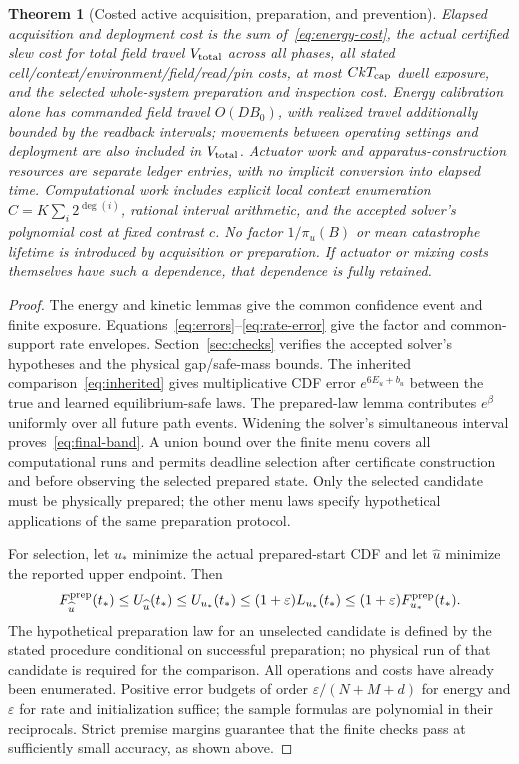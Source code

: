 \documentclass[11pt]{article}
\newtheorem{theorem}{Theorem}
\newcommand{\eps}{\varepsilon}
\begin{document}
\begin{theorem}[Costed active acquisition, preparation, and prevention]
Elapsed acquisition and deployment cost is the sum of~\eqref{eq:energy-cost}, the actual certified slew cost for total field travel $V_{\rm total}$ across all phases, all stated cell/context/environment/field/read/pin costs, at most $CkT_{\rm cap}$ dwell exposure, and the selected whole-system preparation and inspection cost. Energy calibration alone has commanded field travel $O(DB_0)$, with realized travel additionally bounded by the readback intervals; movements between operating settings and deployment are also included in $V_{\rm total}$. Actuator work and apparatus-construction resources are separate ledger entries, with no implicit conversion into elapsed time. Computational work includes explicit local context enumeration $C=K\sum_i2^{\deg(i)}$, rational interval arithmetic, and the accepted solver's polynomial cost at fixed contrast $c$. No factor $1/\pi_u(B)$ or mean catastrophe lifetime is introduced by acquisition or preparation. If actuator or mixing costs themselves have such a dependence, that dependence is fully retained.
\end{theorem}
\begin{proof}
The energy and kinetic lemmas give the common confidence event and finite exposure. Equations~\eqref{eq:errors}--\eqref{eq:rate-error} give the factor and common-support rate envelopes. Section~\ref{sec:checks} verifies the accepted solver's hypotheses and the physical gap/safe-mass bounds. The inherited comparison~\eqref{eq:inherited} gives multiplicative CDF error $e^{6E_u+b_u}$ between the true and learned equilibrium-safe laws. The prepared-law lemma contributes $e^\beta$ uniformly over all future path events. Widening the solver's simultaneous interval proves~\eqref{eq:final-band}. A union bound over the finite menu covers all computational runs and permits deadline selection after certificate construction and before observing the selected prepared state. Only the selected candidate must be physically prepared; the other menu laws specify hypothetical applications of the same preparation protocol.

For selection, let $u_*$ minimize the actual prepared-start CDF and let $\widehat u$ minimize the reported upper endpoint. Then
\[
 F_{\widehat u}^{\rm prep}(t_*)\le U_{\widehat u}(t_*)\le U_{u_*}(t_*)
 \le(1+\eps)L_{u_*}(t_*)\le(1+\eps)F_{u_*}^{\rm prep}(t_*).
\]
The hypothetical preparation law for an unselected candidate is defined by the stated procedure conditional on successful preparation; no physical run of that candidate is required for the comparison. All operations and costs have already been enumerated. Positive error budgets of order $\eps/(N+M+d)$ for energy and $\eps$ for rate and initialization suffice; the sample formulas are polynomial in their reciprocals. Strict premise margins guarantee that the finite checks pass at sufficiently small accuracy, as shown above.
\end{proof}
\end{document}
